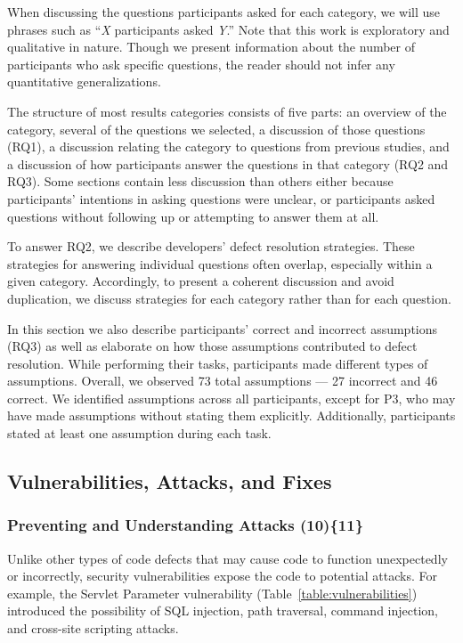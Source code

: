 \documentclass[10pt,journal,compsoc]{IEEEtran}
\begin{document}
When discussing the questions participants asked for each category, we will use phrases such as ``\emph{X} participants asked \emph{Y}.''
Note that this work is exploratory and qualitative in nature.
Though we present information about the number of participants who ask specific questions, the reader should not infer any quantitative generalizations.

The structure of most results categories consists of five parts: an overview of the category, several of the questions we selected, a discussion of those questions (RQ1), a discussion relating the category to questions from previous studies, and a discussion of how participants answer the questions in that category (RQ2 and RQ3).
Some sections contain less discussion than others either because participants' intentions in asking questions were unclear, or participants asked questions without following up or attempting to answer them at all. 

To answer RQ2, we describe developers' defect resolution strategies.
These strategies for answering individual questions often overlap, especially within a given category.
Accordingly, to present a coherent discussion and avoid duplication, we discuss strategies for each category rather than for each question.

In this section we also describe participants' correct and incorrect assumptions (RQ3) as well as elaborate on how those assumptions contributed to defect resolution.
While performing their tasks, participants made different types of assumptions. 
Overall, we observed 73 total assumptions --- 27 incorrect and 46 correct. 
We identified assumptions across all participants, except for P3, who may have made assumptions without stating them explicitly.
Additionally, participants stated at least one assumption during each task.
%


\subsection{Vulnerabilities, Attacks, and Fixes}
\label{sec:results-vaf}

\subsubsection{Preventing and Understanding Attacks (10)\{11\}}
\label{pupa}
Unlike other types of code defects that may cause code to function unexpectedly or incorrectly, security vulnerabilities expose the code to potential attacks. For example, the Servlet Parameter vulnerability (Table~\ref{table:vulnerabilities}) introduced the possibility of SQL injection, path traversal, command injection, and cross-site scripting attacks.
\\
\end{document}
